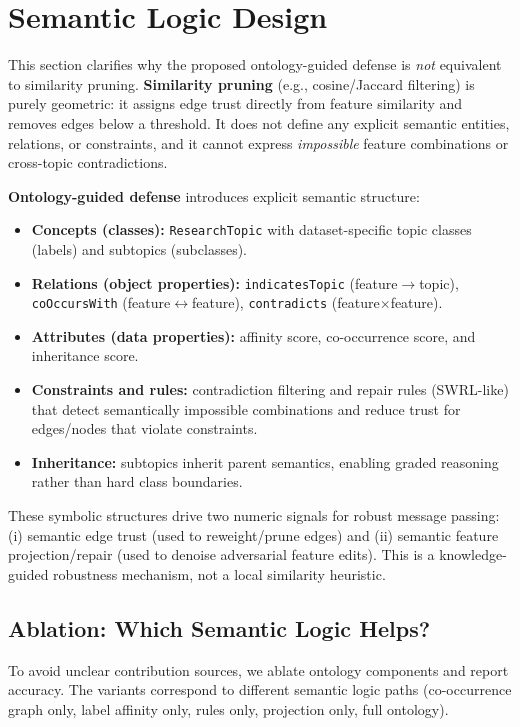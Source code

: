\documentclass[conference]{IEEEtran}
\newcommand{\inputtable}[1]{%
  \IfFileExists{tables/#1}{}{}%
}
\begin{document}
\section{Semantic Logic Design}
This section clarifies why the proposed ontology-guided defense is \textit{not} equivalent to similarity pruning.
\textbf{Similarity pruning} (e.g., cosine/Jaccard filtering) is purely geometric: it assigns edge trust directly from feature similarity and removes edges below a threshold. It does not define any explicit semantic entities, relations, or constraints, and it cannot express \textit{impossible} feature combinations or cross-topic contradictions.

\textbf{Ontology-guided defense} introduces explicit semantic structure:
\begin{itemize}
\item \textbf{Concepts (classes):} \texttt{ResearchTopic} with dataset-specific topic classes (labels) and subtopics (subclasses).
\item \textbf{Relations (object properties):} \texttt{indicatesTopic} (feature$\rightarrow$topic), \texttt{coOccursWith} (feature$\leftrightarrow$feature), \texttt{contradicts} (feature$\times$feature).
\item \textbf{Attributes (data properties):} affinity score, co-occurrence score, and inheritance score.
\item \textbf{Constraints and rules:} contradiction filtering and repair rules (SWRL-like) that detect semantically impossible combinations and reduce trust for edges/nodes that violate constraints.
\item \textbf{Inheritance:} subtopics inherit parent semantics, enabling graded reasoning rather than hard class boundaries.
\end{itemize}
These symbolic structures drive two numeric signals for robust message passing: (i) semantic edge trust (used to reweight/prune edges) and (ii) semantic feature projection/repair (used to denoise adversarial feature edits). This is a knowledge-guided robustness mechanism, not a local similarity heuristic.

\subsection{Ablation: Which Semantic Logic Helps?}
To avoid unclear contribution sources, we ablate ontology components and report accuracy. The variants correspond to different semantic logic paths (co-occurrence graph only, label affinity only, rules only, projection only, full ontology).
\inputtable{semantic_ablation.tex}
\end{document}
